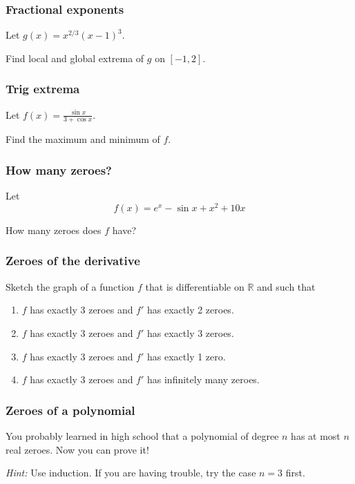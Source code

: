 \begin{frame}[t]
	\frametitle{Fractional exponents}

	Let $\displaystyle g(x) = x^{2/3}(x-1)^{3}.$

	Find local and global extrema of $g$ on $\displaystyle [-1,2]$.
\end{frame}

\begin{frame}[t]
	\frametitle{Trig extrema}

	Let $\displaystyle f(x) = \frac{\sin x}{3 + \cos x}.$

	Find the maximum and minimum of $f$.
\end{frame}

\begin{frame}[t]
	\frametitle{How many zeroes?}

	Let
	\[
		f(x) = e^{x}- \sin x + x^{2}+ 10x
	\]

	How many zeroes does $f$ have?
\end{frame}

\begin{frame}[t]
	\frametitle{Zeroes of the derivative}

	Sketch the graph of a function $f$ that is differentiable on $\mathbb{R}$ and
	such that

	\begin{enumerate}
		\item $f$ has exactly 3 zeroes and $f'$ has exactly 2 zeroes.

		\item $f$ has exactly 3 zeroes and $f'$ has exactly 3 zeroes.

		\item $f$ has exactly 3 zeroes and $f'$ has exactly 1 zero.

		\item $f$ has exactly 3 zeroes and $f'$ has infinitely many zeroes.
	\end{enumerate}
\end{frame}

\begin{frame}[t]
	\frametitle{Zeroes of a polynomial}

	You probably learned in high school that a polynomial of degree $n$ has at
	most $n$ real zeroes. Now you can prove it!

	\emph{Hint:} Use induction. If you are having trouble, try the case $n=3$
	first.
\end{frame}

